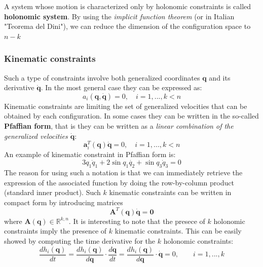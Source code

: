 A system whose motion is characterized only by holonomic constraints is called \textbf{holonomic system}. By using the \textit{implicit function theorem} (or in Italian "Teorema del Dini"), we can reduce the dimension of the configuration space to $n-k$

\subsubsection{Kinematic constraints}
Such a type of constraints involve both generalized coordinates $\mathbf{q}$ and its derivative $\dot{\mathbf{q}}$. In the most general case they can be expressed as:
\begin{equation}
    a_i(\mathbf{q},\dot{\mathbf{q}})=0, \quad i=1,...,k<n   
\end{equation}
Kinematic constraints are limiting the set of generalized velocities that can be obtained by each configuration. In some cases they can be written in the so-called \textbf{Pfaffian form}, that is they can be written as a \textit{linear combination of the generalized velocities $\dot{\mathbf{q}}$}: 
\begin{equation}
    \mathbf{a}_i^T(\mathbf{q})\dot{{\mathbf{q}}}=0, \quad
    i=1,...,k<n
\end{equation}
An example of kinematic constraint in Pfaffian form is:
\begin{equation*}
    3q_1 \dot{q}_1 +
    2 \sin{q_1}\dot{q_2}+
    \sin{q_3} \dot{q}_3 =0   
\end{equation*}
The reason for using such a notation is that we can immediately retrieve the expression of the associated function by doing the row-by-column product (standard inner product). Such $k$ kinematic constraints can be written in compact form by introducing matrices
\begin{equation}\label{eq:matrix_pfaffian}
    \mathbf{A}^T(\mathbf{q})\dot{\mathbf{q}}=\mathbf{0}
\end{equation}
where $\mathbf{A(q)}\in\mathbb{R}^{k,n}.$ It is interesting to note that the presece of $k$ holonomic constraints imply the presence of $k$ kinematic constraints. This can be easily showed by computing the time derivative for the $k$ holonomic constraints: 
\begin{equation}\label{eq:kin_holonomic}
    \frac{d h_i(\mathbf{q})}{dt}=
    \frac{d h_i(\mathbf{q})}{d\mathbf{q}}\cdot
    \frac{d \mathbf{q}}{dt}=
    \frac{d h_i(\mathbf{q})}{d\mathbf{q}}\cdot \dot{\mathbf{q}}=0, \qquad
    i=1,...,k
\end{equation}

